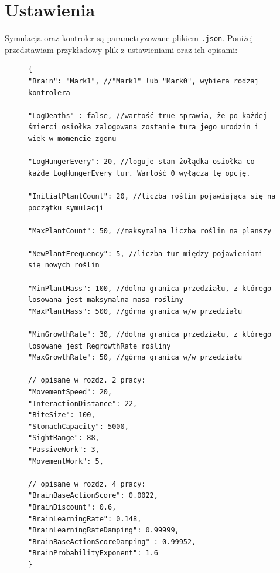 \section{Ustawienia}
Symulacja oraz kontroler są parametryzowane plikiem \texttt{.json}. Poniżej przedstawiam przykładowy plik z ustawieniami oraz ich opisami:
\begin{figure}[h]
\label{fig:example_settings}
\begin{lstlisting}[language=json_comment]
{
"Brain": "Mark1", //"Mark1" lub "Mark0", wybiera rodzaj kontrolera

"LogDeaths" : false, //wartość true sprawia, że po każdej śmierci osiołka zalogowana zostanie tura jego urodzin i wiek w momencie zgonu

"LogHungerEvery": 20, //loguje stan żołądka osiołka co każde LogHungerEvery tur. Wartość 0 wyłącza tę opcję.

"InitialPlantCount": 20, //liczba roślin pojawiająca się na początku symulacji

"MaxPlantCount": 50, //maksymalna liczba roślin na planszy

"NewPlantFrequency": 5, //liczba tur między pojawieniami się nowych roślin

"MinPlantMass": 100, //dolna granica przedziału, z którego losowana jest maksymalna masa rośliny
"MaxPlantMass": 500, //górna granica w/w przedziału

"MinGrowthRate": 30, //dolna granica przedziału, z którego losowane jest RegrowthRate rośliny
"MaxGrowthRate": 50, //górna granica w/w przedziału

// opisane w rozdz. 2 pracy:
"MovementSpeed": 20,         
"InteractionDistance": 22,         
"BiteSize": 100,         
"StomachCapacity": 5000,        
"SightRange": 88, 
"PassiveWork": 3,
"MovementWork": 5,

// opisane w rozdz. 4 pracy:
"BrainBaseActionScore": 0.0022,
"BrainDiscount": 0.6,        
"BrainLearningRate": 0.148,        
"BrainLearningRateDamping": 0.99999,         
"BrainBaseActionScoreDamping" : 0.99952,         
"BrainProbabilityExponent": 1.6 
}
\end{lstlisting}
\end{figure}
